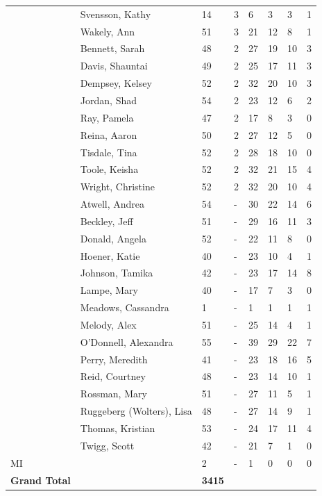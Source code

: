 \documentclass{article}\usepackage[]{graphicx}\usepackage[]{color}
\begin{document}
{\begin{longtable} { >{\raggedright}p{}p{}p{}p{}p{}p{}p{}p{}}
   \rowcolor[gray]{0.90} & Svensson, Kathy & 14 & 3 & 6 & 3 & 3 & 1 \\ 
   \rowcolor[gray]{0.90} & Wakely, Ann & 51 & 3 & 21 & 12 & 8 & 1 \\ 
   & Bennett, Sarah & 48 & 2 & 27 & 19 & 10 & 3 \\ 
   & Davis, Shauntai & 49 & 2 & 25 & 17 & 11 & 3 \\ 
   & Dempsey, Kelsey & 52 & 2 & 32 & 20 & 10 & 3 \\ 
   \rowcolor[gray]{0.90} & Jordan, Shad & 54 & 2 & 23 & 12 & 6 & 2 \\ 
   \rowcolor[gray]{0.90} & Ray, Pamela & 47 & 2 & 17 & 8 & 3 & 0 \\ 
   \rowcolor[gray]{0.90} & Reina, Aaron & 50 & 2 & 27 & 12 & 5 & 0 \\ 
   & Tisdale, Tina & 52 & 2 & 28 & 18 & 10 & 0 \\ 
   & Toole, Keisha & 52 & 2 & 32 & 21 & 15 & 4 \\ 
   & Wright, Christine & 52 & 2 & 32 & 20 & 10 & 4 \\ 
   \rowcolor[gray]{0.90} & Atwell, Andrea & 54 & - & 30 & 22 & 14 & 6 \\ 
   \rowcolor[gray]{0.90} & Beckley, Jeff & 51 & - & 29 & 16 & 11 & 3 \\ 
   \rowcolor[gray]{0.90} & Donald, Angela & 52 & - & 22 & 11 & 8 & 0 \\ 
   & Hoener, Katie & 40 & - & 23 & 10 & 4 & 1 \\ 
   & Johnson, Tamika & 42 & - & 23 & 17 & 14 & 8 \\ 
   & Lampe, Mary & 40 & - & 17 & 7 & 3 & 0 \\ 
   \rowcolor[gray]{0.90} & Meadows, Cassandra & 1 & - & 1 & 1 & 1 & 1 \\ 
   \rowcolor[gray]{0.90} & Melody, Alex & 51 & - & 25 & 14 & 4 & 1 \\ 
   \rowcolor[gray]{0.90} & O'Donnell, Alexandra & 55 & - & 39 & 29 & 22 & 7 \\ 
   & Perry, Meredith & 41 & - & 23 & 18 & 16 & 5 \\ 
   & Reid, Courtney & 48 & - & 23 & 14 & 10 & 1 \\ 
   & Rossman, Mary & 51 & - & 27 & 11 & 5 & 1 \\ 
   \rowcolor[gray]{0.90} & Ruggeberg (Wolters), Lisa & 48 & - & 27 & 14 & 9 & 1 \\ 
   \rowcolor[gray]{0.90} & Thomas, Kristian & 53 & - & 24 & 17 & 11 & 4 \\ 
   \rowcolor[gray]{0.90} & Twigg, Scott & 42 & - & 21 & 7 & 1 & 0 \\ 
   \hline
MI &  & 2 & - & 1 & 0 & 0 & 0 \\ 
   \hline
\hline
\textbf{Grand Total} &  & \textbf{ 3415 } &  & {\textbf{1817} & {\textbf{1053} & {\textbf{641} & {\textbf{158} \\ 
   \end{longtable}

}
\end{document}

